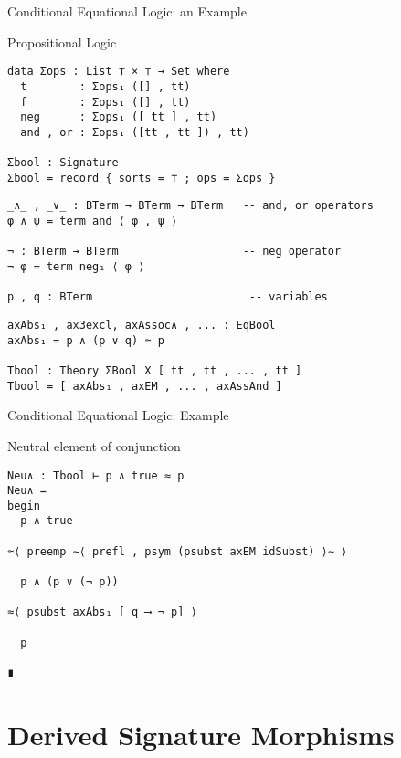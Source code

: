 \documentclass[11pt]{beamer}
\begin{document}
\begin{frame}[fragile]{Conditional Equational Logic: an Example}

  \begin{block}{Propositional Logic}
    \begin{verbatim}
data Σops : List ⊤ × ⊤ → Set where
  t        : Σops₁ ([] , tt)
  f        : Σops₁ ([] , tt)
  neg      : Σops₁ ([ tt ] , tt)
  and , or : Σops₁ ([tt , tt ]) , tt)

Σbool : Signature
Σbool = record { sorts = ⊤ ; ops = Σops }
\end{verbatim}
%
\pause
%    
\begin{verbatim}
_∧_ , _∨_ : BTerm → BTerm → BTerm   -- and, or operators
φ ∧ ψ = term and ⟨ φ , ψ ⟩
  
¬ : BTerm → BTerm                   -- neg operator
¬ φ = term neg₁ ⟨ φ ⟩   

p , q : BTerm                        -- variables
\end{verbatim}
\pause
\begin{verbatim}
axAbs₁ , ax3excl, axAssoc∧ , ... : EqBool
axAbs₁ = p ∧ (p ∨ q) ≈ p

Tbool : Theory ΣBool X [ tt , tt , ... , tt ]
Tbool = [ axAbs₁ , axEM , ... , axAssAnd ]
\end{verbatim}
    
\end{block}
\end{frame}

\begin{frame}[fragile]{Conditional Equational Logic: Example}

\begin{block}{Neutral element of conjunction}
\begin{verbatim}
Neu∧ : Tbool ⊢ p ∧ true ≈ p
Neu∧ =
begin
  p ∧ true

≈⟨ preemp ∼⟨ prefl , psym (psubst axEM idSubst) ⟩∼ ⟩

  p ∧ (p ∨ (¬ p))

≈⟨ psubst axAbs₁ [ q ⟶ ¬ p] ⟩

  p

∎
\end{verbatim}
\end{block}
\end{frame}



\section{Derived Signature Morphisms}
\end{document}
